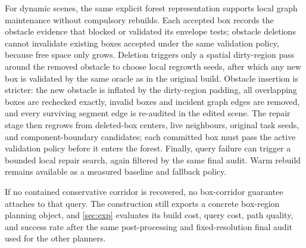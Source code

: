 \documentclass[journal]{IEEEtran}
\DeclareRobustCommand{\textsc}[1]{\textnormal{\MakeUppercase{#1}}}
\newcommand{\calO}{\ensuremath{\mathcal{O}}}
\begin{document}
For dynamic scenes, the same explicit forest representation supports local
graph maintenance without compulsory rebuilds. Each accepted box records the
obstacle evidence that blocked or validated its envelope tests; obstacle
deletions cannot invalidate existing boxes accepted under the same validation
policy, because free space only grows. Deletion triggers only a spatial dirty-region pass around the removed
obstacle to choose local regrowth seeds, after which any new box is validated by
the same oracle as in the original build. Obstacle insertion is stricter: the
new obstacle is inflated by the dirty-region padding, all overlapping boxes are
rechecked exactly, invalid boxes and incident graph edges are removed, and every
surviving segment edge is re-audited in the edited scene. The repair stage then
regrows from deleted-box centers, live neighbours, original task seeds, and
component-boundary candidates; each committed box must pass the active
validation policy before it enters the forest. Finally, query failure can trigger a
bounded local repair search, again filtered by the same final audit. Warm
rebuild remains available as a measured baseline and fallback policy.


If no contained conservative corridor is recovered, no box-corridor guarantee
attaches to that query. The construction still exports a concrete box-region
planning object, and \cref{sec:exp} evaluates its build cost, query cost, path
quality, and success rate after the same post-processing and fixed-resolution
final audit used for the other planners.
\end{document}
